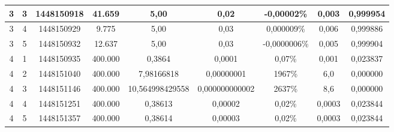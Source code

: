 \begin{landscape}
\begin{center}
\begin{table}[htbp]
\begin{tabular}{ccccccccc}
\hline
         3 &          3 & 1448150918 &     41.659 &       5,00 &       0,02 & -0,00002\% &      0,003 &   0,999954 \\
\hline
         3 &          4 & 1448150929 &      9.775 &       5,00 &       0,03 & 0,000009\% &      0,006 &   0,999886 \\
\hline
         3 &          5 & 1448150932 &     12.637 &       5,00 &       0,03 & -0,0000006\% &      0,005 &   0,999904 \\
\hline \hline
         4 &          1 & 1448150935 &    400.000 &     0,3864 &     0,0001 &     0,07\% &      0,001 &   0,023837 \\
\hline
         4 &          2 & 1448151040 &    400.000 & 7,98166818 & 0,00000001 &     1967\% &        6,0 &   0,000000 \\
\hline
         4 &          3 & 1448151146 &    400.000 & 10,564998429558 & 0,000000000002 &     2637\% &        8,6 &   0,000000 \\
\hline
         4 &          4 & 1448151251 &    400.000 &    0,38613 &    0,00002 &     0,02\% &     0,0003 &   0,023844 \\
\hline
         4 &          5 & 1448151357 &    400.000 &    0,38614 &    0,00003 &     0,02\% &     0,0003 &   0,023844 \\
\hline \hline
\end{tabular}  
\end{table}
\end{center}	
\end{landscape}

